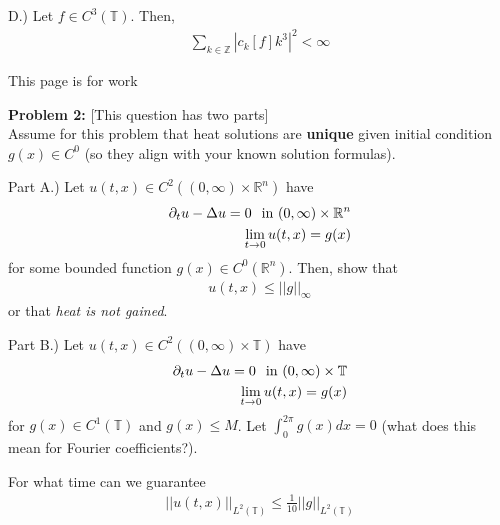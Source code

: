 \documentclass{article}
\newcommand{\Z}{{\mathbb{Z}}}
\newcommand{\R}{{\mathbb{R}}}
\newcommand{ \norm }[1]{{ || {#1}||}}
\newcommand{\pd}{\partial}
\begin{document}
\vspace{3 cm}
D.) Let $f \in C^{3}(\mathbb{T})$. Then, 
\begin{align*}
	\sum_{k \in \Z} |c_{k}[f]k^{3}|^{2} < \infty 
\end{align*}


\newpage

This page is for work
\newpage



\textbf{Problem 2:} [This question has two parts]\\

Assume for this problem that heat solutions are \textbf{unique} given initial condition $g(x) \in C^{0}$ (so they align with your known solution formulas). 

\vspace{1 cm}

Part A.) Let $u(t,x) \in C^{2}((0,\infty) \times \R^{n})$ have 
\begin{align*}
	\pd_{t}u - \Delta u =0 \hspace{0.25 cm} \text{in } (0,\infty) \times \R^{n}\\
	\lim_{t \to 0 } u(t,x) = g(x)
\end{align*}
for some bounded function $g(x) \in C^{0}(\R^{n})$. Then, show that 
\begin{align*}
	 u(t,x) \leq \norm{g}_{\infty} 
\end{align*}
or that \textit{heat is not gained}.



\newpage

\vspace{0.5 cm}

Part B.) Let $u(t,x) \in C^{2}((0,\infty) \times \mathbb{T})$ have 
\begin{align*}
	\pd_{t}u - \Delta u =0 \hspace{0.25 cm} \text{in } (0,\infty) \times \mathbb{T}\\
	\lim_{t \to 0 } u(t,x) = g(x)
\end{align*}
for $g(x) \in C^{1}(\mathbb{T})$ and $g(x) \leq M$. Let $\int_{0}^{2\pi} g(x)dx = 0$ (what does this mean for Fourier coefficients?). 

For what time can we guarantee 
\begin{align*}
	\norm{u(t,x)}_{L^{2}(\mathbb{T})} \leq \frac{1}{10} \norm{g}_{L^{2}(\mathbb{T})}
\end{align*}

 
\end{document}
